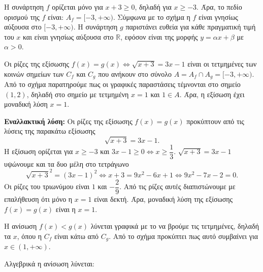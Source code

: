 \begin{alist}
\item Η συνάρτηση $f$ ορίζεται μόνο για $x + 3 \ge 0$, δηλαδή για $x \ge -3$.
Άρα, το πεδίο ορισμού της $f$ είναι: $A_f = [-3, +\infty)$.
Σύμφωνα με το σχήμα η $f$ είναι γνησίως αύξουσα στο $[-3, +\infty)$.
Η συνάρτηση $g$ παριστάνει ευθεία για κάθε πραγματική τιμή του $x$ και είναι γνησίως αύξουσα στο $\mathbb{R}$, εφόσον είναι της μορφής $y = \alpha x + \beta$ με $\alpha > 0$.
\item Οι ρίζες της εξίσωσης $f(x) = g(x) \Leftrightarrow \sqrt{x + 3} = 3x - 1$ είναι οι τετμημένες των κοινών σημείων των $C_f$ και $C_g$ που ανήκουν στο σύνολο $A = A_f \cap A_g = [-3, +\infty)$.
Από το σχήμα παρατηρούμε πως οι γραφικές παραστάσεις τέμνονται στο σημείο $(1, 2)$,
δηλαδή στο σημείο με τετμημένη $x = 1$ και $1 \in A$.
Άρα, η εξίσωση έχει μοναδική λύση $x = 1$.

\textbf{Εναλλακτική λύση:}
Οι ρίζες της εξίσωσης $f(x) = g(x)$ προκύπτουν από τις λύσεις της παρακάτω εξίσωσης
\[\sqrt{x + 3} = 3x - 1.\]
Η εξίσωση ορίζεται για $x \ge -3$ και $3x - 1 \ge 0 \Leftrightarrow x \ge \dfrac{1}{3}$.
$\sqrt{x + 3} = 3x - 1$ υψώνουμε και τα δυο μέλη στο τετράγωνο
\[\sqrt{x + 3}^2 = (3x - 1)^2 \Leftrightarrow x + 3 = 9x^2 - 6x + 1 \Leftrightarrow 9x^2 - 7x - 2 = 0.\]
Οι ρίζες του τριωνύμου είναι $1$ και $-\dfrac{2}{9}$. Από τις ρίζες αυτές διαπιστώνουμε με επαλήθευση ότι μόνο η $x = 1$ είναι δεκτή.
Άρα, μοναδική λύση της εξίσωσης $f(x) = g(x)$ είναι η $x = 1$.
\item 
\begin{rlist}
\item Η ανίσωση $f(x) < g(x)$ λύνεται γραφικά με το να βρούμε τις τετμημένες, δηλαδή τα $x$, όπου η $C_f$ είναι κάτω από $C_g$.
Από το σχήμα προκύπτει πως αυτό συμβαίνει για $x \in (1, +\infty)$.
\item Αλγεβρικά η ανίσωση λύνεται: %
\end{rlist}
\end{alist}

